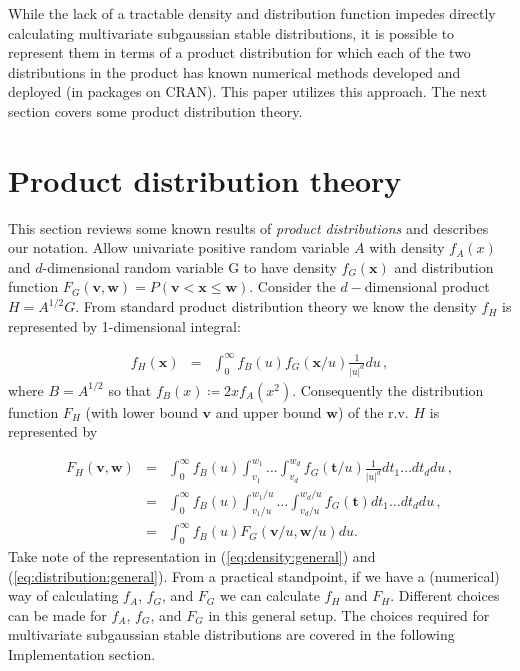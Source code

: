   
While the lack of a tractable density and distribution function
impedes directly calculating multivariate subgaussian stable
distributions, it is possible to represent them in terms of a product
distribution for which each of the two distributions in the product
has known numerical methods developed and deployed (in 
packages on CRAN). This paper utilizes this approach.  The next
section covers some product distribution theory.




\section{Product distribution theory \label{sect:pdt}}

This section reviews some known results of \emph{product
distributions} and describes our notation.  Allow univariate positive
random variable $A$ with density $f_A(x)$ and $d$-dimensional random
variable G to have density $f_G(\bm{x})$ and distribution function
$F_G(\bm{v}, \bm{w}) = P( \bm{v} < \bm{x} \leq \bm{w})$.  Consider the
$d-$dimensional product $H=A^{1/2} G$.  From standard product
distribution theory we know the density $f_H$ is represented by
1-dimensional integral:

\begin{eqnarray}
f_{H}(\bm{x}) &=& \int_0^{\infty} f_B(u) f_G(\bm{x} / u)
\frac{1}{|u|^d} du \,, \label{eq:density:general}
\end{eqnarray}
where $B=A^{1/2}$ so that $f_B(x) \coloneqq 2 x f_A(x^2)$.
Consequently the distribution function $F_H$ (with lower bound $\bm{v}$ and
upper bound $\bm{w}$) of the r.v. $H$ is represented by

\begin{eqnarray}
F_{H}(\bm{v}, \bm{w}) 
&=& \int_0^{\infty} 
f_B(u) 
\int_{v_1}^{w_1} \dots \int_{v_d}^{w_d}  f_G(\bm{t} / u) \frac{1}{|u|^d} dt_1 \dots dt_d
du \,, \\
&=& \int_0^{\infty} 
f_B(u) 
\int_{v_1 / u}^{w_1 / u} \dots \int_{v_d / u}^{w_d / u}  f_G(\bm{t})
dt_1 \dots dt_d du \,, \nonumber \\
&=& \int_0^{\infty} 
f_B(u) F_G(\bm{v} / u, \bm{w}/u) du. \label{eq:distribution:general}
\end{eqnarray}
Take note of the representation in (\ref{eq:density:general}) and (\ref{eq:distribution:general}).  From
a practical standpoint, if we have a (numerical) way of calculating
$f_A$, $f_G$, and $F_G$ we can calculate $f_H$ and $F_H$.  Different
choices can be made for $f_A$, $f_G$, and $F_G$ in this general
setup.  The choices required for multivariate subgaussian stable
distributions are covered in the following Implementation section.

